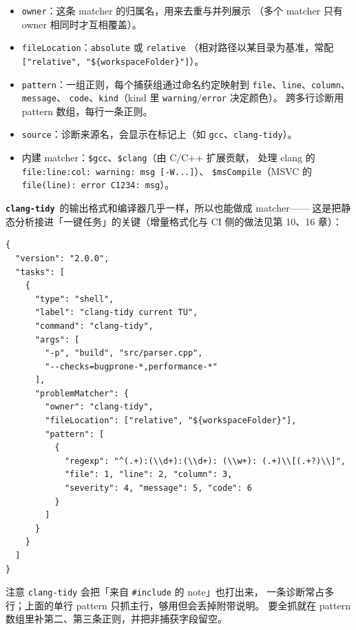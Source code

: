 \documentclass[12pt,a4paper,fontset=fandol]{ctexbook}
\newcommand{\Bk}{\discretionary{}{}{}}
\newcommand{\Lib}[1]{\textbf{\texttt{#1}}}
\newcommand{\Tidy}{\Lib{clang-tidy}}
\begin{document}
\begin{itemize}
  \item \texttt{owner}：这条 matcher 的归属名，用来去重与并列展示
        （多个 matcher 只有 owner 相同时才互相覆盖）。
  \item \texttt{fileLocation}：\texttt{absolute} 或 \texttt{relative}
        （相对路径以某目录为基准，常配
        \texttt{["relative", "\$\{workspaceFolder\}"]}）。
  \item \texttt{pattern}：一组正则，每个捕获组通过命名约定映射到
        \texttt{file}、\texttt{line}、\texttt{column}、\texttt{message}、
        \texttt{code}、\texttt{kind}（kind 里 \texttt{warning}/{\Bk}\texttt{error} 决定颜色）。
        跨多行诊断用 pattern 数组，每行一条正则。
  \item \texttt{source}：诊断来源名，会显示在标记上（如 \texttt{gcc}、\texttt{clang-tidy}）。
  \item 内建 matcher：\texttt{\$gcc}、\texttt{\$clang}（由 C/C++ 扩展贡献，
        处理 clang 的 \texttt{file:line:col: warning: msg [-W...]}）、
        \texttt{\$msCompile}（MSVC 的 \texttt{file(line): error C1234: msg}）。
\end{itemize}

\Tidy\ 的输出格式和编译器几乎一样，所以也能做成 matcher——
这是把静态分析接进「一键任务」的关键（增量格式化与 CI 侧的做法见第 10、16 章）：

\begin{lstlisting}[style=jsonstyle,caption={自定义 problemMatcher：把 clang-tidy 诊断映射成可点击标记},label={lst:ch07-tidy-matcher}]
{
  "version": "2.0.0",
  "tasks": [
    {
      "type": "shell",
      "label": "clang-tidy current TU",
      "command": "clang-tidy",
      "args": [
        "-p", "build", "src/parser.cpp",
        "--checks=bugprone-*,performance-*"
      ],
      "problemMatcher": {
        "owner": "clang-tidy",
        "fileLocation": ["relative", "${workspaceFolder}"],
        "pattern": [
          {
            "regexp": "^(.+):(\\d+):(\\d+): (\\w+): (.+)\\[(.+?)\\]",
            "file": 1, "line": 2, "column": 3,
            "severity": 4, "message": 5, "code": 6
          }
        ]
      }
    }
  ]
}
\end{lstlisting}

注意 \texttt{clang-tidy} 会把「来自 \texttt{\#include} 的 note」也打出来，
一条诊断常占多行；上面的单行 pattern 只抓主行，够用但会丢掉附带说明。
要全抓就在 pattern 数组里补第二、第三条正则，并把非捕获字段留空。
\end{document}
